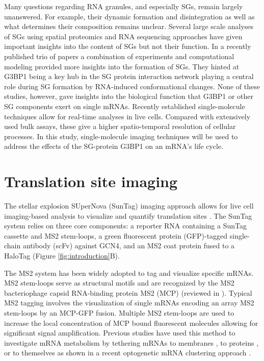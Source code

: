 Many questions regarding RNA granules, and especially SGs, remain largely unanswered.
For example, their dynamic formation and disintegration as well as what determines their composition remains unclear.
Several large scale analyses of SGs using spatial proteomics \cite{markmiller_context-dependent_2018, jain_atpase-modulated_2016, youn_high-density_2018} and RNA sequencing \cite{khong_isolation_2018} approaches have given important insights into the content of SGs but not their function.
In a recently published trio of papers \cite{guillen-boixet_rna-induced_2020, sanders_competing_2020, yang_g3bp1_2020} a combination of experiments and computational modeling provided more insights into the formation of SGs.
They hinted at G3BP1 being a key hub in the SG protein interaction network playing a central role during SG formation by RNA-induced conformational changes.
None of these studies, however, gave insights into the biological function that G3BP1 or other SG components exert on single mRNAs.
Recently established single-molecule techniques allow for real-time analyses in live cells.
Compared with extensively used bulk assays, these give a higher spatio-temporal resolution of cellular processes.
In this study, single-molecule imaging techniques will be used to address the effects of the SG-protein G3BP1 on an mRNA's life cycle.

    
\section{Translation site imaging} \label{translation_site_imaging}

The stellar explosion SUperNova (SunTag) imaging approach allows for live cell imaging-based analysis to visualize and quantify translation sites \cite{tanenbaum_protein-tagging_2014}.
The SunTag system relies on three core components: a reporter RNA containing a SunTag cassette and MS2 stem-loops, a green fluorescent protein (GFP)-tagged single-chain antibody (scFv) against GCN4, and an MS2 coat protein fused to a HaloTag (Figure \ref{fig:introduction}B).

The MS2 system has been widely adopted to tag and visualize specific mRNAs.
MS2 stem-loops serve as structural motifs and are recognized by the MS2 bacteriophage capsid RNA-binding protein MS2 (MCP) (reviewed in \cite{george_intracellular_2018}).
Typical MS2 tagging involves the visualization of single mRNAs encoding an array MS2 stem-loops by an MCP-GFP fusion.
Multiple MS2 stem-loops are used to increase the local concentration of MCP bound fluorescent molecules allowing for significant signal amplification.
Previous studies have used this method to investigate mRNA metabolism by tethering mRNAs to membranes \cite{genz_association_2013}, to proteins \cite{bos_tethered_2016}, or to themselves as shown in a recent optogenetic mRNA clustering approach \cite{kim_optogenetic_2020}.

